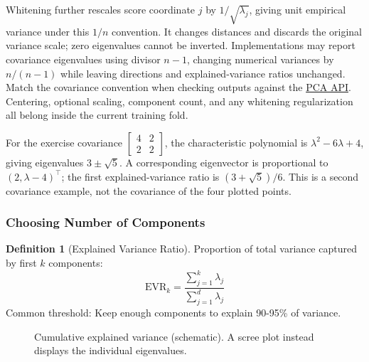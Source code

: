 \documentclass[11pt,twoside]{article}
\numberwithin{equation}{section}
\theoremstyle{plain}
\theoremstyle{definition}
\newtheorem{definition}[theorem]{Definition}
\theoremstyle{remark}
\begin{document}
Whitening further rescales score coordinate $j$ by $1/\sqrt{\lambda_j}$, giving unit empirical variance under this $1/n$ convention. It changes distances and discards the original variance scale; zero eigenvalues cannot be inverted. Implementations may report covariance eigenvalues using divisor $n-1$, changing numerical variances by $n/(n-1)$ while leaving directions and explained-variance ratios unchanged. Match the covariance convention when checking outputs against the \href{https://scikit-learn.org/stable/modules/generated/sklearn.decomposition.PCA.html}{PCA API}. Centering, optional scaling, component count, and any whitening regularization all belong inside the current training fold.

For the exercise covariance $\left[\begin{smallmatrix}4&2\\2&2\end{smallmatrix}\right]$, the characteristic polynomial is $\lambda^2-6\lambda+4$, giving eigenvalues $3\pm\sqrt5$. A corresponding eigenvector is proportional to $(2,\lambda-4)^\top$; the first explained-variance ratio is $(3+\sqrt5)/6$. This is a second covariance example, not the covariance of the four plotted points.

\subsubsection{Choosing Number of Components}

\begin{definition}[Explained Variance Ratio]
Proportion of total variance captured by first $k$ components:
\[
\text{EVR}_k = \frac{\sum_{j=1}^k \lambda_j}{\sum_{j=1}^d \lambda_j}
\]
Common threshold: Keep enough components to explain 90-95\% of variance.
\end{definition}

\begin{figure}[H]
\centering
{}
\caption{Cumulative explained variance (schematic). A scree plot instead displays the individual eigenvalues.}
\end{figure}
\end{document}
